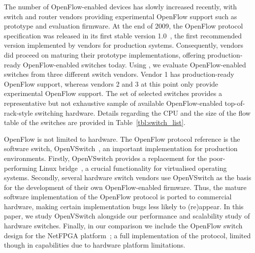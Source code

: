 The number of OpenFlow-enabled devices has slowly increased recently, with
switch and router vendors providing experimental OpenFlow support such
as prototype and evaluation firmware. At the end of 2009, the OpenFlow
protocol specification was released in its first stable version 1.0~\cite{openflow-spec}, 
the first recommended version implemented by vendors for production systems. 
Consequently, vendors did proceed on maturing their prototype implementations, 
offering production-ready OpenFlow-enabled switches today. Using \oflops, we 
evaluate OpenFlow-enabled switches from three different switch vendors.
Vendor 1 has production-ready OpenFlow support, whereas vendors 2 and
3 at this point only provide experimental OpenFlow support. 
The set of selected switches provides a representative but not
exhaustive sample of available OpenFlow-enabled top-of-rack-style
switching hardware. Details regarding the CPU and the size of the
flow table of the switches are provided in Table~\ref{tbl:switch_list}.

OpenFlow is not limited to hardware. The OpenFlow protocol reference
is the software switch, OpenVSwitch~\cite{openvswitch}, an important
implementation for production environments. Firstly, OpenVSwitch
provides a replacement for the poor-performing Linux bridge~\cite{bianco10}, 
a crucial functionality for virtualised operating systems.  Secondly, several 
hardware switch vendors use OpenVSwitch as the basis for the development 
of their own OpenFlow-enabled firmware. Thus, the mature software implementation 
of the OpenFlow protocol is ported to commercial hardware, making certain
implementation bugs less likely to (re)appear. In this paper, we study
OpenVSwitch alongside our performance and scalability study of
hardware switches. Finally, in our comparison we include the OpenFlow
switch design for the NetFPGA platform~\cite{openflow-netfpga}; a full
implementation of the protocol, limited though in capabilities due to hardware 
platform limitations.


